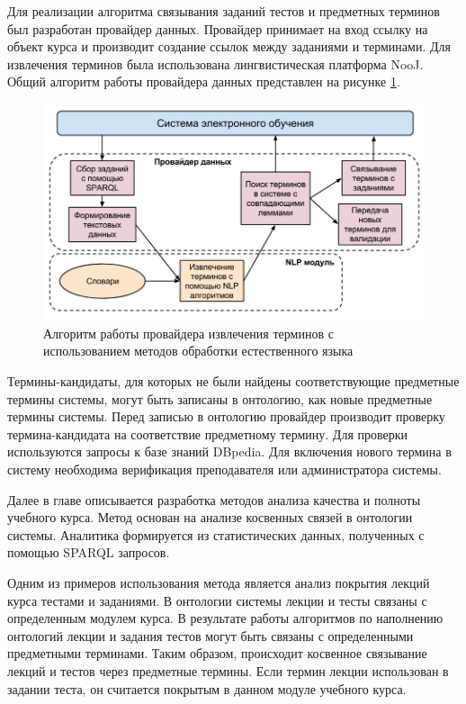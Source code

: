 Для реализации алгоритма связывания заданий тестов и предметных терминов был разработан провайдер данных. Провайдер принимает на вход ссылку на объект курса и производит создание ссылок между заданиями и терминами. Для извлечения терминов была использована лингвистическая платформа NooJ. Общий алгоритм работы провайдера данных представлен на рисунке \ref{fig:NLPAlgo}.

\begin{figure}[ht] 
  \center
  \includegraphics[scale=0.45]{NLPAlgo}
  \caption{Алгоритм работы провайдера извлечения терминов с использованием методов обработки естественного языка} 
  \label{fig:NLPAlgo}
\end{figure}

Термины-кандидаты, для которых не были найдены соответствующие предметные термины системы, могут быть записаны в онтологию, как новые предметные термины системы. Перед записью в онтологию провайдер производит проверку термина-кандидата на соответствие предметному термину. Для проверки используются запросы к базе знаний DBpedia. Для включения нового термина в систему необходима верификация преподавателя или администратора системы. 

Далее в главе описывается разработка методов анализа качества и полноты учебного курса. Метод основан на анализе косвенных связей в онтологии системы. Аналитика формируется из статистических данных, полученных с помощью SPARQL запросов. 

Одним из примеров использования метода является анализ покрытия лекций курса тестами и заданиями. В онтологии системы лекции и тесты связаны с определенным модулем курса. В результате работы алгоритмов по наполнению онтологий лекции и задания тестов могут быть связаны с определенными предметными терминами. Таким образом, происходит косвенное связывание лекций и тестов через предметные термины. Если термин лекции использован в задании теста, он считается покрытым в данном модуле учебного курса.

